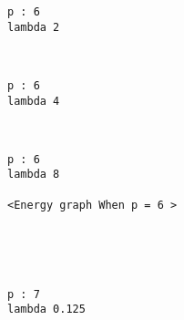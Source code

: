 \documentclass[11pt]{article}
\begin{document}
    \begin{Verbatim}[commandchars=\\\{\}]
p : 6
lambda 2

    \end{Verbatim}

    \begin{center}
    \end{center}
    { \hspace*{\fill} \\}
    
    \begin{Verbatim}[commandchars=\\\{\}]
p : 6
lambda 4

    \end{Verbatim}

    \begin{center}
    \end{center}
    { \hspace*{\fill} \\}
    
    \begin{Verbatim}[commandchars=\\\{\}]
p : 6
lambda 8

<Energy graph When p = 6 >

    \end{Verbatim}

    \begin{center}
    \end{center}
    { \hspace*{\fill} \\}
    
    \begin{center}
    \end{center}
    { \hspace*{\fill} \\}
    
    \begin{Verbatim}[commandchars=\\\{\}]
p : 7
lambda 0.125

    \end{Verbatim}

    \begin{center}
    \end{center}
    { \hspace*{\fill} \\}
    
\end{document}
